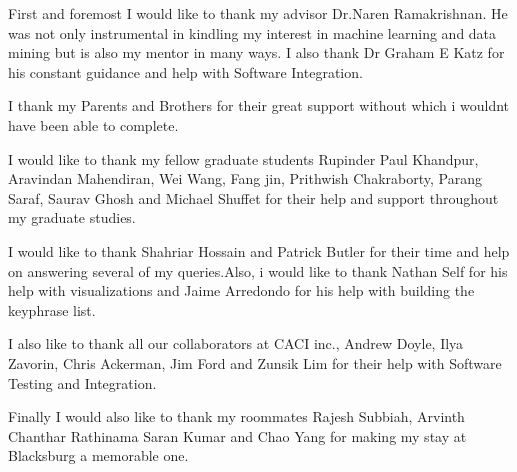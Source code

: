 \vspace*{\fill}
\Large{First and foremost I would like to thank my advisor Dr.Naren Ramakrishnan. He was not only instrumental in kindling my interest in machine learning and data mining but is also my mentor in many ways. I also thank Dr Graham E Katz for his constant guidance and help with Software Integration.

I thank my Parents and Brothers for their great support without which i wouldnt have been able to complete.

I would like to thank my fellow graduate students Rupinder Paul Khandpur, Aravindan Mahendiran, Wei Wang, Fang jin, Prithwish Chakraborty, Parang Saraf, Saurav Ghosh and Michael Shuffet for their help and support throughout my graduate studies. 

I would like to thank Shahriar Hossain and Patrick Butler for their time and help on answering several of my queries.Also, i would like to thank Nathan Self for his help with visualizations and Jaime Arredondo for his help with building the keyphrase list.

I also like to thank all our collaborators at CACI inc., Andrew Doyle, Ilya Zavorin, Chris Ackerman, Jim Ford and Zunsik Lim for their help with Software Testing and Integration.

Finally I would also like to thank my roommates Rajesh Subbiah, Arvinth Chanthar Rathinama Saran Kumar and Chao Yang for making my stay at Blacksburg a memorable one.}

\vspace{\fill}

